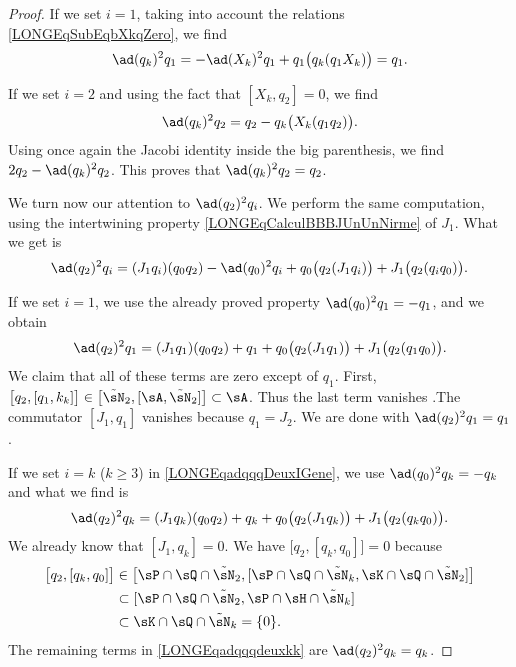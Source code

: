 \begin{proof}
	If we set $i=1$, taking into account the relations \eqref{LONGEqSubEqbXkqZero}, we find
	\begin{equation}
		\ad(q_k)^2q_1=-\ad(X_k)^2q_1+q_1\big( q_k(q_1X_k) \big)=q_1.
	\end{equation}

	If we set $i=2$ and using the fact that $[X_k,q_2]=0$, we find
	\begin{equation}
		\ad(q_k)^2q_2=q_2-q_k\big( X_k(q_1q_2) \big).
	\end{equation}
	Using once again the Jacobi identity inside the big parenthesis, we find $2q_2-\ad(q_k)^2q_2$. This proves that $\ad(q_k)^2q_2=q_2$.


	We turn now our attention to $\ad(q_2)^2q_i$. We perform the same computation, using the intertwining property \eqref{LONGEqCalculBBBJUnUnNirme} of $J_1$. What we get is
	\begin{equation}		\label{LONGEqadqqqDeuxIGene}
		\ad(q_2)^2q_i=(J_1q_i)(q_0q_2)-\ad(q_0)^2q_i+q_0\big( q_2(J_1q_i) \big)+J_1\big( q_2(q_iq_0) \big).
	\end{equation}

	If we set $i=1$, we use the already proved property $\ad(q_0)^2q_1=-q_1$, and we obtain
	\begin{equation}
		\ad(q_2)^2q_1=(J_1q_1)(q_0q_2)+q_1+q_0\big( q_2(J_1q_1) \big)+J_1\big( q_2(q_1q_0) \big).
	\end{equation}
	We claim that all of these terms are zero except of $q_1$. First, $\big[ q_2,[q_1,k_k] \big]\in\big[ \tilde\sN_2,[\sA,\tilde\sN_2] \big]\subset\sA$.	Thus the last term vanishes .The commutator $[J_1,q_1]$ vanishes because $q_1=J_2$. We are done with $\ad(q_2)^2q_1=q_1$.

	If we set $i=k$ ($k\geq 3$) in \eqref{LONGEqadqqqDeuxIGene}, we use $\ad(q_0)^2q_k=-q_k$ and what we find is
	\begin{equation}		\label{LONGEqadqqqdeuxkk}
		\ad(q_2)^2q_k=(J_1q_k)(q_0q_2)+q_k+q_0\big( q_2(J_1q_k) \big)+J_1\big( q_2(q_kq_0) \big).
	\end{equation}
	We already know that $[J_1,q_k]=0$. We have $\big[ q_2,[q_k,q_0] \big]=0$ because
	\begin{equation}
		\begin{aligned}[]
			\big[ q_2,[q_k,q_0] \big]&\in\big[ \sP\cap\sQ\cap\tilde\sN_2,[\sP\cap\sQ\cap\tilde\sN_k,\sK\cap\sQ\cap\tilde\sN_2] \big]\\
						&\subset[\sP\cap\sQ\cap\tilde\sN_2,\sP\cap\sH\cap\tilde\sN_k]\\
						&\subset\sK\cap\sQ\cap\tilde\sN_k=\{ 0 \}.
		\end{aligned}
	\end{equation}
	The remaining terms in \eqref{LONGEqadqqqdeuxkk} are $\ad(q_2)^2q_k=q_k$.


\end{proof}
